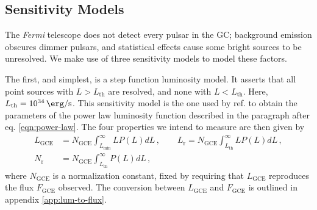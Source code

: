 \documentclass[a4paper,11pt]{article}
\begin{document}
\subsection{Sensitivity Models}
\label{sec:sensitivity}
The \textit{Fermi} telescope does not detect every pulsar in the GC; background emission obscures dimmer pulsars, and statistical effects cause some bright sources to be unresolved. We make use of three sensitivity models to model these factors.

The first, and simplest, is a step function luminosity model. It asserts that all point sources with $L>L_\text{th}$ are resolved, and none with $L<L_{\text{th}}$. Here, $L_\text{th} = \SI{e34}{\erg\per\second}$. This sensitivity model is the one used by ref. \cite{Zhong:2019ycb} to obtain the parameters of the power law luminosity function described in the paragraph after eq. \ref{eqn:power-law}. The four properties we intend to measure are then given by
\begin{equation}
    \begin{split}
        L_\text{GCE} &= N_\text{GCE}\int_{L_\text{min}}^\infty L P(L) dL \,, \qquad
        L_\text{r} = N_\text{GCE}\int_{L_\text{th}}^\infty L P(L) dL \,, \\
        N_\text{r} &= N_\text{GCE}\int_{L_\text{th}}^\infty P(L) dL \,,
        \label{eqn:observables-sens-1}
    \end{split}
\end{equation}
where $N_\text{GCE}$ is a normalization constant, fixed by requiring that $L_\text{GCE}$ reproduces the flux $F_\text{GCE}$ observed. The conversion between $L_\text{GCE}$ and $F_\text{GCE}$ is outlined in appendix \ref{app:lum-to-flux}.
\end{document}
